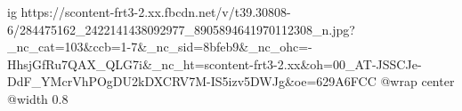  
 
 
 
 

\ifcmt
  ig https://scontent-frt3-2.xx.fbcdn.net/v/t39.30808-6/284475162_2422141438092977_8905894641970112308_n.jpg?_nc_cat=103&ccb=1-7&_nc_sid=8bfeb9&_nc_ohc=-HhsjGfRu7QAX_QLG7i&_nc_ht=scontent-frt3-2.xx&oh=00_AT-JSSCJe-DdF_YMcrVhPOgDU2kDXCRV7M-IS5izv5DWJg&oe=629A6FCC
  @wrap center
  @width 0.8
\fi
